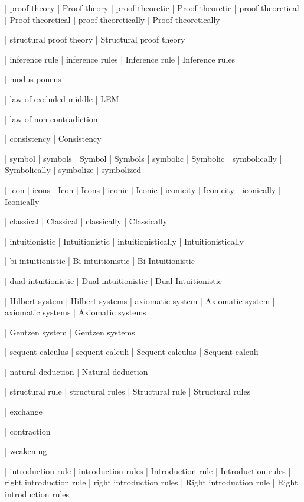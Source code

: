  | proof theory
 | Proof theory
 | proof-theoretic
 | Proof-theoretic
 | proof-theoretical
 | Proof-theoretical
 | proof-theoretically
 | Proof-theoretically

 | structural proof theory
 | Structural proof theory

 | inference rule
 | inference rules
 | Inference rule
 | Inference rules

 | modus ponens

 | law of excluded middle
 | LEM

 | law of non-contradiction

 | consistency
 | Consistency

 | symbol
 | symbols
 | Symbol
 | Symbols
 | symbolic
 | Symbolic
 | symbolically
 | Symbolically
 | symbolize
 | symbolized

 | icon
 | icons
 | Icon
 | Icons
 | iconic
 | Iconic
 | iconicity
 | Iconicity
 | iconically
 | Iconically
 
 | classical
 | Classical
 | classically
 | Classically

 | intuitionistic
 | Intuitionistic
 | intuitionistically
 | Intuitionistically

 | bi-intuitionistic
 | Bi-intuitionistic
 | Bi-Intuitionistic

 | dual-intuitionistic
 | Dual-intuitionistic
 | Dual-Intuitionistic

 | Hilbert system
 | Hilbert systems
 | axiomatic system
 | Axiomatic system
 | axiomatic systems
 | Axiomatic systems

 | Gentzen system
 | Gentzen systems

 | sequent calculus
 | sequent calculi
 | Sequent calculus
 | Sequent calculi

 | natural deduction
 | Natural deduction

 | structural rule
 | structural rules
 | Structural rule
 | Structural rules

 | exchange

 | contraction

 | weakening

 | introduction rule
 | introduction rules
 | Introduction rule
 | Introduction rules
 | right introduction rule
 | right introduction rules
 | Right introduction rule
 | Right introduction rules

